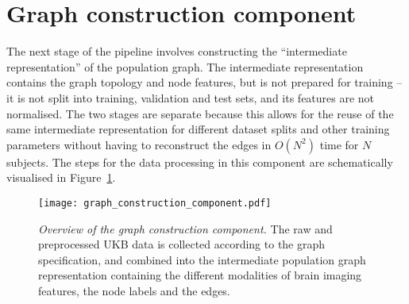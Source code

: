 \section{Graph construction component}
\label{section:graph-construction}
The next stage of the pipeline involves constructing the ``intermediate representation'' of the population graph. The intermediate representation contains the graph topology and node features, but is not prepared for training – it is not split into training, validation and test sets, and its features are not normalised. The two stages are separate because this allows for the reuse of the same intermediate representation for different dataset splits and other training parameters without having to reconstruct the edges in $O(N^2)$ time for $N$ subjects. The steps for the data processing in this component are schematically visualised in Figure~\ref{graph-construction-component}.

\begin{figure}[h]
    \texttt{[image: graph\_construction\_component.pdf]}
    \caption{\textit{Overview of the graph construction component.}
    The raw and preprocessed UKB data is collected according to the graph specification, and combined into the intermediate population graph representation containing the different modalities of brain imaging features, the node labels and the edges.
    }\label{graph-construction-component}
\end{figure}

